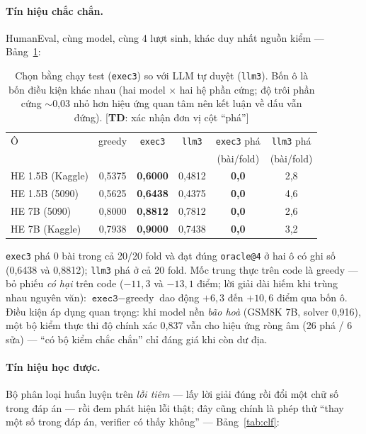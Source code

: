 \documentclass[11pt,a4paper]{article}
\newcommand{\todoTD}[1]{\textcolor{red!70!black}{[\textbf{TD}: #1]}}
\begin{document}
\paragraph{Tín hiệu chắc chắn.} HumanEval, cùng model, cùng 4 lượt sinh, khác duy nhất nguồn
kiểm --- Bảng~\ref{tab:exec}:

\begin{table}[t]\centering\small
\begin{tabular}{lccccc}\toprule
Ô & greedy & \texttt{exec3} & \texttt{llm3} & \texttt{exec3} phá & \texttt{llm3} phá\\
 & & & & (bài/fold) & (bài/fold)\\\midrule
HE 1.5B (Kaggle) & 0,5375 & \textbf{0,6000} & 0,4812 & \textbf{0,0} & 2,8\\
HE 1.5B (5090)   & 0,5625 & \textbf{0,6438} & 0,4375 & \textbf{0,0} & 4,6\\
HE 7B (5090)     & 0,8000 & \textbf{0,8812} & 0,7812 & \textbf{0,0} & 2,6\\
HE 7B (Kaggle)   & 0,7938 & \textbf{0,9000} & 0,7438 & \textbf{0,0} & 3,2\\\bottomrule
\end{tabular}
\caption{Chọn bằng chạy test (\texttt{exec3}) so với LLM tự duyệt (\texttt{llm3}). Bốn ô là bốn
điều kiện khác nhau (hai model $\times$ hai hệ phần cứng; độ trôi phần cứng $\sim$0,03 nhỏ hơn
hiệu ứng quan tâm nên kết luận về dấu vẫn đứng). \todoTD{xác nhận đơn vị cột ``phá''}}
\label{tab:exec}
\end{table}

\texttt{exec3} phá 0 bài trong cả 20/20 fold và đạt đúng \texttt{oracle@4} ở hai ô có ghi số
(0,6438 và 0,8812); \texttt{llm3} phá ở cả 20 fold. Mốc trung thực trên code là greedy --- bỏ
phiếu \emph{có hại} trên code ($-11{,}3$ và $-13{,}1$ điểm; lời giải dài hiếm khi trùng nhau
nguyên văn): $\texttt{exec3}-\text{greedy}$ dao động $+6{,}3$ đến $+10{,}6$ điểm qua bốn ô.
Điều kiện áp dụng quan trọng: khi model nền \emph{bão hoà} (GSM8K 7B, solver 0,916), một bộ
kiểm thực thi độ chính xác 0,837 vẫn cho hiệu ứng ròng âm (26 phá / 6 sửa) --- ``có bộ kiểm
chắc chắn'' chỉ đáng giá khi còn dư địa.

\paragraph{Tín hiệu học được.} Bộ phân loại huấn luyện trên \emph{lỗi tiêm} --- lấy lời giải
đúng rồi đổi một chữ số trong đáp án --- rồi đem phát hiện lỗi thật; đây cũng chính là phép thử
``thay một số trong đáp án, verifier có thấy không'' --- Bảng~\ref{tab:clf}:
\end{document}
